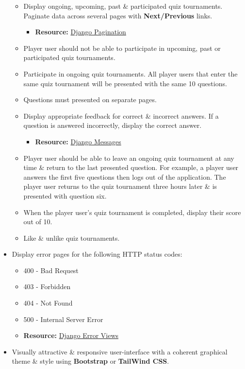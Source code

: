 \documentclass{article}
\begin{document}
\begin{itemize}
\begin{itemize}
		\item Display ongoing, upcoming, past \& participated quiz tournaments. Paginate data across several pages with \textbf{Next/Previous} links.
		\begin{itemize}
			\item \textbf{Resource:} \href{https://docs.djangoproject.com/en/3.1/topics/pagination/}{Django Pagination}
		\end{itemize}
		\item Player user should not be able to participate in upcoming, past or participated quiz tournaments.
		\item Participate in ongoing quiz tournaments. All player users that enter the same quiz tournament will be presented with the same 10 questions.
		\item Questions must presented on separate pages.
		\item Display appropriate feedback for correct \& incorrect answers. If a question is answered incorrectly, display the correct answer.
		\begin{itemize}
			\item \textbf{Resource:} \href{https://docs.djangoproject.com/en/3.1/ref/contrib/messages}{Django Messages}
		\end{itemize}
		\item Player user should be able to leave an ongoing quiz tournament at any time \& return to the last presented question. For example, a player user answers the first five questions then logs out of the application. The player user returns to the quiz tournament three hours later \& is presented with question six.
		\item When the player user's quiz tournament is completed, display their score out of 10.
		\item Like \& unlike quiz tournaments.
	\end{itemize}
	\item Display error pages for the following HTTP status codes:
	\begin{itemize}
		\item 400 - Bad Request
		\item 403 - Forbidden
		\item 404 - Not Found
		\item 500 - Internal Server Error
		\item \textbf{Resource:} \href{https://docs.djangoproject.com/en/3.1/ref/views/#error-views}{Django Error Views}
	\end{itemize}
	\item Visually attractive \& responsive user-interface with a coherent graphical theme \& style using \textbf{Bootstrap} or \textbf{TailWind CSS}.

\end{itemize}
\end{document}
